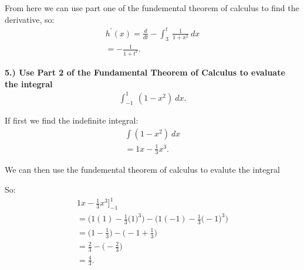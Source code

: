 \documentclass{report}
\begin{document}
    \bigbreak \noindent \bigbreak \noindent
    From here we can use part one of the fundemental theorem of calculus to find the derivative, so:
    \begin{align*}
      h^{\prime}(x) = \frac{d}{dt} -\int_{3}^{t}\ \frac{1}{1+x^{2}}\ dx \\
      \boxed{= -\frac{1}{1+t^{2}}}
    .\end{align*}

    \pagebreak \bigbreak \noindent
    \begin{mdframed}
      \textbf{5.) Use Part 2 of the Fundamental Theorem of Calculus to evaluate the integral}
      \begin{align*}
        \int_{-1}^{1}\ (1-x^{2})\ dx
      .\end{align*}
    \end{mdframed}

    \bigbreak \noindent \bigbreak \noindent
    If first we find the indefinite integral:
    \begin{align*}
      \int (1-x^{2})\ dx \\
      = 1x-\frac{1}{3}x^{3}
    .\end{align*}

    \bigbreak \noindent \bigbreak \noindent
    We can then use the fundemental theorem of calculus to evalute the integral

    \bigbreak \noindent \bigbreak \noindent
    So:
    \begin{align*}
      1x-\frac{1}{3}x^{3}\bigg]_{-1}^{1} \\
      = \bigg(1(1)-\frac{1}{3}\bigg(1\bigg)^{3}\bigg) - \bigg(1(-1) - \frac{1}{3}\bigg(-1\bigg)^{3}\bigg) \\
      = \bigg(1-\frac{1}{3}\bigg) - \bigg(-1 +\frac{1}{3}\bigg) \\
      = \frac{2}{3} - \bigg(-\frac{2}{3}\bigg) \\
      \boxed{= \frac{4}{3}}
    .\end{align*}






   
\end{document}
